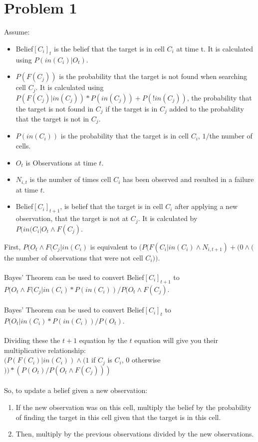 \documentclass[12pt]{report}
\begin{document}
\section{Problem 1}
Assume:\begin{itemize}
	\item Belief$[C_{i}]_{t}$ is the belief that the target is in cell $C_{i}$ at time {t}. It is calculated using $P(in(C_{i})|O_{t})$.
	\item $P(F(C_{j}))$ is the probability that the target is not found when searching cell $C_{j}$. 
		It is calculated using $P(F(C_{j})|in(C_{j}))*P(in(C_{j}))+P(!in(C_{j}))$, the probability that the target is 
		not found in $C_{j}$ if the target is in $C_{j}$ added to the probability that the target is not in $C_{j}$.
	\item $P(in(C_{i}))$ is the probability that the target is in cell $C_{i}$, $1/$the number of cells.
	\item $O_{t}$ is Observations at time $t$.
	\item $N_{i,t}$ is the number of times cell $C_{i}$ has been observed and resulted in a failure at time $t$.
	\item Belief$[C_{i}]_{t+1}$, is belief that the target is in cell $C_{i}$ after applying a new observation, that the target is not at $C_{j}$. It is calculated by $P(in(C_{i}|O_{t}\land F(C_{j})$.
\end{itemize}
First, $P(O_{t}\land F(C_{j}|in(C_{i})$ is equivalent to $(P(F(C_{i}|in(C_{i})\wedge N_{i,t+1})+(0\wedge($the number of observations that were not cell $C_{i}))$.\\
\\
Bayes' Theorem can be used to convert Belief$[C_{i}]_{t+1}$ to\\
$P(O_{t}\land F(C_{j}|in(C_{i})*P(in(C_{i}))/P(O_{t}\land F(C_{j})$.\\
\\
Bayes' Theorem can be used to convert Belief$[C_{i}]_{t}$ to\\
$P(O_{t}|in(C_{i})*P(in(C_{i}))/P(O_{t})$.\\
\\
Dividing these the $t+1$ equation by the $t$ equation will give you their multiplicative relationship:\\
$(P(F(C_{i})|in(C_{i}))\wedge (1$ if $C_{j}$ is $C_{i}$, $0$ otherwise$))*(P(O_{t})/P(O_{t}\land F(C_{j})))$\\
\\
So, to update a belief given a new observation:\\
\begin{enumerate}
	\item If the new observation was on this cell, multiply the belief by the probability of finding the target in this cell given that the target is in this cell.
	\item Then, multiply by the previous observations divided by the new observations.
\end{enumerate}
\end{document}

